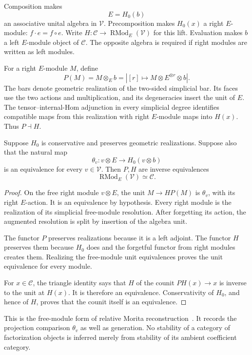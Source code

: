 Composition makes
\[
 E=H_0(b)
\]
an associative unital algebra in $\mathcal V$.
Precomposition makes $H_0(x)$ a right $E$-module: $f\cdot e=f\circ e$.
Write $H:\mathcal C\to\operatorname{RMod}_E(\mathcal V)$ for this lift.
Evaluation makes $b$ a left $E$-module object of $\mathcal C$.
The opposite algebra is required if right modules are written as left modules.

For a right $E$-module $M$, define
\[
 P(M)=M\otimes_E b
   =\left|[r]\longmapsto M\otimes E^{\otimes r}\otimes b\right|.
\]
The bars denote geometric realization of the two-sided simplicial bar.
Its faces use the two actions and multiplication, and its degeneracies insert the unit of $E$.
The tensor--internal-Hom adjunction in every simplicial degree identifies compatible maps from this realization with right $E$-module maps into $H(x)$.
Thus $P\dashv H$.

\begin{proposition}\label{cbc:modules:relative-morita}
Suppose $H_0$ is conservative and preserves geometric realizations.
Suppose also that the natural map
\[
 \theta_v:v\otimes E\longrightarrow H_0(v\otimes b)
\]
is an equivalence for every $v\in\mathcal V$.
Then $P,H$ are inverse equivalences
\[
 \operatorname{RMod}_E(\mathcal V)\simeq\mathcal C.
\]
\end{proposition}
\begin{proof}
On the free right module $v\otimes E$, the unit $M\to HP(M)$ is $\theta_v$, with its right $E$-action.
It is an equivalence by hypothesis.
Every right module is the realization of its simplicial free-module resolution.
After forgetting its action, the augmented resolution is split by insertion of the algebra unit.

The functor $P$ preserves realizations because it is a left adjoint.
The functor $H$ preserves them because $H_0$ does and the forgetful functor from right modules creates them.
Realizing the free-module unit equivalences proves the unit equivalence for every module.

For $x\in\mathcal C$, the triangle identity says that $H$ of the counit $PH(x)\to x$ is inverse to the unit at $H(x)$.
It is therefore an equivalence.
Conservativity of $H_0$, and hence of $H$, proves that the counit itself is an equivalence.
\end{proof}

This is the free-module form of relative Morita reconstruction~\cite[Proposition~4.8.5.8]{LurieHA}.
It records the projection comparison $\theta_v$ as well as generation.
No stability of a category of factorization objects is inferred merely from stability of its ambient coefficient category.

